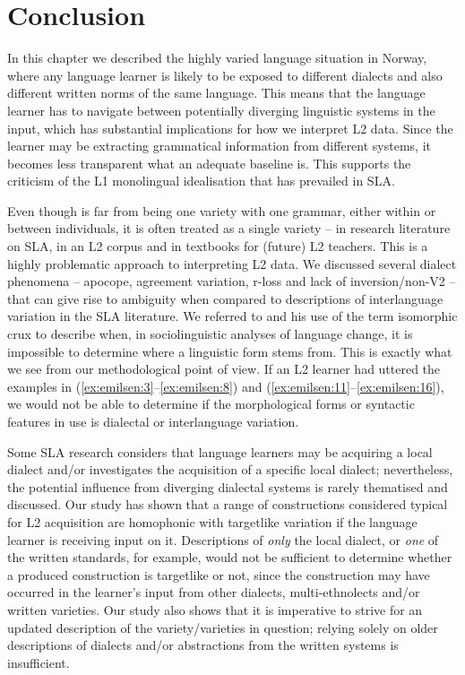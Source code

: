 \documentclass[output=paper,colorlinks,citecolor=brown,modfonts,nonflat]{../langscibook}
\begin{document}
\section{Conclusion}\label{sec:emilsen:4}%

In this chapter we described the highly varied language situation in Norway, where any language learner is likely to be exposed to different dialects and also different written norms of the same language. This means that the language learner has to navigate between potentially diverging linguistic systems in the input, which has substantial implications for how we interpret L2 data. Since the learner may be extracting grammatical information from different systems, it becomes less transparent what an adequate baseline is. This supports the criticism of the L1 monolingual idealisation that has prevailed in SLA. 

Even though  is far from being one variety with one grammar, either within or between individuals, it is often treated as a single variety – in research literature on SLA, in an L2 corpus and in textbooks for (future) L2 teachers. This is a highly problematic approach to interpreting L2 data. We discussed several dialect phenomena – apocope, agreement variation, r-loss and lack of inversion/non-V2 – that can give rise to ambiguity when compared to descriptions of interlanguage variation in the SLA literature. We referred to \citet{Hårstad2009} and his use of the term isomorphic crux to describe when, in sociolinguistic analyses of language change, it is impossible to determine where a linguistic form stems from. This is exactly what we see from our methodological point of view. If an L2 learner had uttered the examples in (\ref{ex:emilsen:3}--\ref{ex:emilsen:8}) and (\ref{ex:emilsen:11}--\ref{ex:emilsen:16}), we would not be able to determine if the morphological forms or syntactic features in use is dialectal or interlanguage variation. 

Some SLA research considers that language learners may be acquiring a local dialect and/or investigates the acquisition of a specific local dialect; nevertheless, the potential influence from diverging dialectal systems is rarely thematised and discussed. Our study has shown that a range of constructions considered typical for L2 acquisition are homophonic with targetlike variation if the language learner is receiving input on it. Descriptions of \textit{only} the local dialect, or \textit{one} of the written standards, for example, would not be sufficient to determine whether a produced construction is targetlike or not, since the construction may have occurred in the learner’s input from other dialects, multi-ethnolects and/or written varieties. Our study also shows that it is imperative to strive for an updated description of the variety/varieties in question; relying solely on older descriptions of dialects and/or abstractions from the written systems is insufficient.
\end{document}
